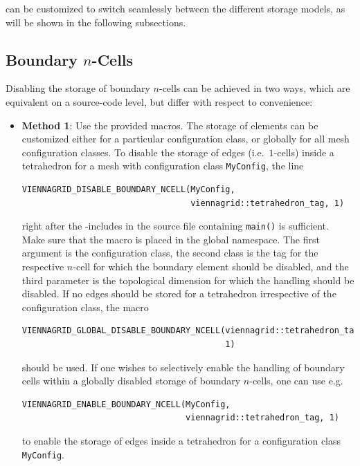 {\ViennaGrid} can be customized to switch seamlessly between the different storage models, as will be shown in the following subsections.


\subsection{Boundary $n$-Cells} \label{subsec:boundary-ncells-storage}

Disabling the storage of boundary $n$-cells can be achieved in two ways, which are equivalent on a source-code level, but differ with respect to convenience:
\begin{itemize}
 \item \textbf{Method 1}: Use the provided macros. The storage of elements can be customized either for a particular configuration class, or globally for all mesh configuration classes. To disable the storage of edges (i.e.~$1$-cells) inside a tetrahedron for a mesh with configuration class \lstinline|MyConfig|, the line
  \begin{lstlisting}
VIENNAGRID_DISABLE_BOUNDARY_NCELL(MyConfig,
                                  viennagrid::tetrahedron_tag, 1)
  \end{lstlisting}
right after the {\ViennaGrid}-includes in the source file containing \lstinline|main()| is sufficient. Make sure that the macro is placed in the global namespace. The first argument is the configuration class, the second class is the tag for the respective $n$-cell for which the boundary element should be disabled, and the third parameter is the topological dimension for which the handling should be disabled.
 If no edges should be stored for a tetrahedron irrespective of the configuration class, the macro
  \begin{lstlisting}
VIENNAGRID_GLOBAL_DISABLE_BOUNDARY_NCELL(viennagrid::tetrahedron_tag,
                                         1)
  \end{lstlisting}
 should be used. If one wishes to selectively enable the handling of boundary cells within a globally disabled storage of boundary $n$-cells, one can use e.g.
  \begin{lstlisting}
VIENNAGRID_ENABLE_BOUNDARY_NCELL(MyConfig,
                                 viennagrid::tetrahedron_tag, 1)
  \end{lstlisting}
 to enable the storage of edges inside a tetrahedron for a configuration class \lstinline|MyConfig|.


\end{itemize}
